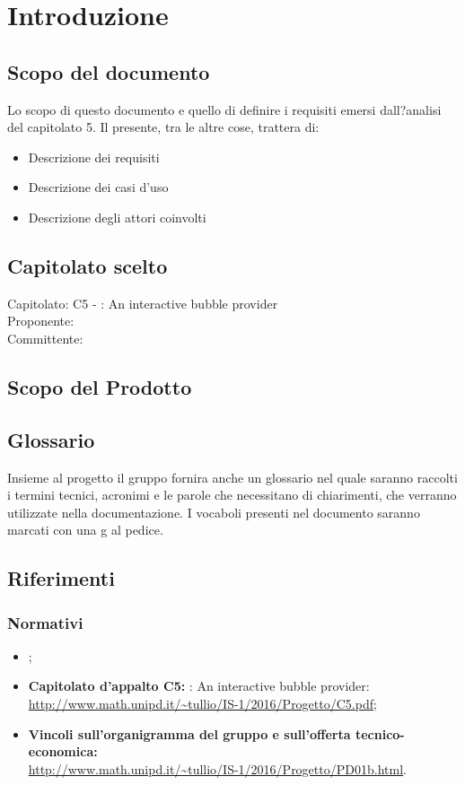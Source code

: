 \section{Introduzione}

\subsection{Scopo del documento}
Lo scopo di questo documento e quello di definire i requisiti emersi dall?analisi del capitolato 5.
Il presente, tra le altre cose, trattera di:
\begin{itemize}
	\item Descrizione dei requisiti
	\item Descrizione dei casi d'uso
	\item Descrizione degli attori coinvolti
\end{itemize}

\subsection{Capitolato scelto}
Capitolato: C5 - \ProjectName{}: An interactive bubble provider \\
Proponente: \Proponente{} \\
Committente: \Committente{} \\

\subsection{Scopo del Prodotto}
\ScopoDelProdotto

\subsection{Glossario}
Insieme al progetto il gruppo fornira anche un glossario nel quale saranno raccolti i termini tecnici, acronimi e le parole che necessitano di chiarimenti, che verranno utilizzate nella documentazione.
I vocaboli presenti nel documento \Glossario saranno marcati con una g al pedice.

\subsection{Riferimenti}
\subsubsection{Normativi}
\begin{itemize}
	\item \textbf{\NormeDiProgetto};
	\item\textbf{ Capitolato d'appalto C5:} \ProjectName{}: An interactive bubble provider: \url{http://www.math.unipd.it/~tullio/IS-1/2016/Progetto/C5.pdf};
	\item \textbf{Vincoli sull'organigramma del gruppo e sull'offerta tecnico-economica:} \\ \url{http://www.math.unipd.it/~tullio/IS-1/2016/Progetto/PD01b.html}.
\end{itemize}

